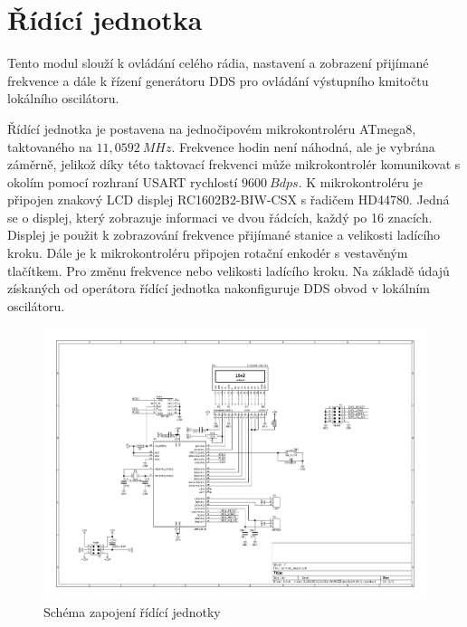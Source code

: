 \clearpage
\section{Řídící jednotka}
\indent\indent Tento modul slouží k ovládání celého rádia, nastavení a zobrazení přijímané frekvence a dále k řízení generátoru DDS pro ovládání výstupního kmitočtu lokálního oscilátoru.

Řídící jednotka je postavena na jednočipovém mikrokontroléru ATmega8, taktovaného na $11,0592~MHz$. Frekvence hodin není náhodná, ale je vybrána záměrně, jelikož díky této taktovací frekvenci může mikrokontrolér komunikovat s okolím pomocí rozhraní USART rychlostí $9600~Bdps$. K mikrokontroléru je připojen znakový LCD displej RC1602B2-BIW-CSX s řadičem HD44780. Jedná se o displej, který zobrazuje informaci ve dvou řádcích, každý po 16 znacích. Displej je použit k zobrazování frekvence přijímané stanice a velikosti ladícího kroku. Dále je k mikrokontroléru připojen rotační enkodér s vestavěným tlačítkem. Pro změnu frekvence nebo velikosti ladícího kroku. Na základě údajů získaných od operátora řídící jednotka nakonfiguruje DDS obvod v lokálním oscilátoru.

\begin{landscape}
	\begin{figure}[h]
		\centering 	
		\includegraphics[height=\textwidth]{img/cu/sch.pdf}
		\caption{Schéma zapojení řídící jednotky}	
	\end{figure}
\end{landscape}
%

